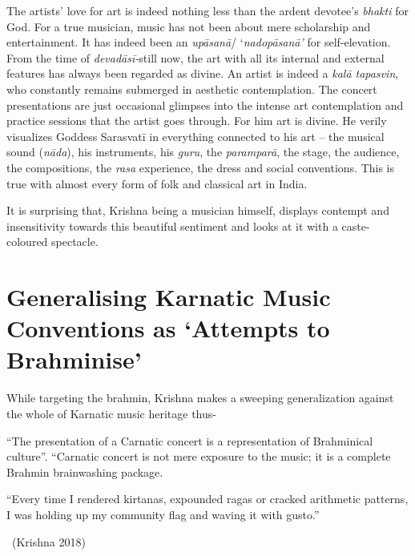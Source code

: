 The artists’ love for art is indeed nothing less than the ardent devotee’s \textit{bhakti} for God. For a true musician, music has not been about mere scholarship and entertainment. It has indeed been an \textit{upāsanā}/ ‘\textit{nadopāsanā’} for self-elevation. From the time of \textit{devadāsī-}s\break till now, the art with all its internal and external features has always been regarded as divine. An artist is indeed a \textit{kalā tapasvin}, who constantly remains submerged in aesthetic contemplation. The concert presentations are just occasional glimpses into the intense art contemplation and practice sessions that the artist goes through. For him art is divine. He verily visualizes Goddess Sarasvatī in everything connected to his art – the musical sound (\textit{nāda}), his instruments, his \textit{guru}, the \textit{paramparā}, the stage, the audience, the compositions, the \textit{rasa} experience, the dress and social conventions. This is true with almost every form of folk and classical art in India.

It is surprising that, Krishna being a musician himself, displays contempt and insensitivity towards this beautiful sentiment and looks at it with a caste-coloured spectacle.

\vspace{-.55cm}

\section*{Generalising Karnatic Music Conventions as ‘Attempts to Brahminise’}

While targeting the brahmin, Krishna makes a sweeping generalization against the whole of Karnatic music heritage thus-

\vspace{-.1cm}

\begin{myquote}
“The presentation of a Carnatic concert is a representation of Brahminical culture”. “Carnatic concert is not mere exposure to the music; it is a complete Brahmin brainwashing package.
\end{myquote}


\begin{myquote}
“Every time I rendered kirtanas, expounded ragas or cracked arithmetic patterns, I was holding up my community flag and waving it with gusto.” 

\vspace{-.1cm}

~\hfill (Krishna 2018)
\end{myquote}

